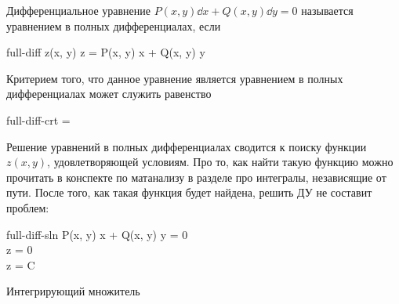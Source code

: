 
\begin{definition}
  Дифференциальное уравнение \(P(x, y) \dd x + Q(x, y) \dd y = 0\) называется
  уравнением в полных дифференциалах, если
  \begin{lequation}{full-diff}
    \exists z(x, y) \colon \dd z = P(x, y) \dd x + Q(x, y) \dd y
  \end{lequation}
\end{definition}

Критерием того, что данное уравнение является уравнением в полных
дифференциалах может служить равенство

\begin{lequation}{full-diff-crt}
   =  
\end{lequation}

Решение уравнений в полных дифференциалах сводится к поиску функции \(z(x, y)\),
удовлетворяющей условиям. Про то, как найти такую функцию можно прочитать в
конспекте по матанализу в разделе про интегралы, независящие от пути. После
того, как такая функция будет найдена, решить ДУ не составит проблем:

\begin{lequation}{full-diff-sln}
  P(x, y) \dd x + Q(x, y) \dd y = 0 \\
  \dd z = 0 \\
  z = C
\end{lequation}

\todo Интегрирующий множитель
